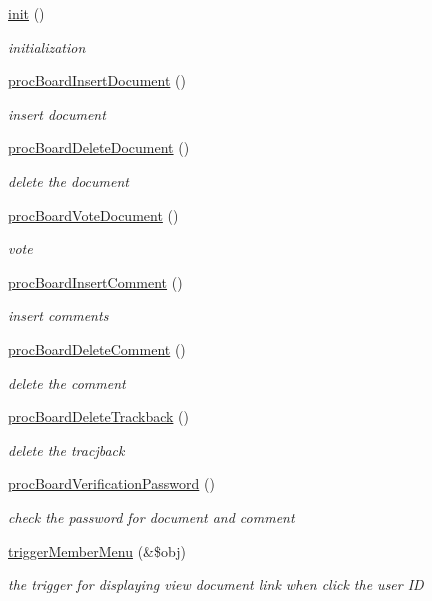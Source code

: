\begin{DoxyCompactItemize}
\item 
\hyperlink{classboardController_a1e9dcbf2879520adc6c5ce9b68361408}{init} ()
\begin{DoxyCompactList}\small\item\em initialization \end{DoxyCompactList}\item 
\hyperlink{classboardController_a14ee978c5be08ee33f4c00a6960c4e60}{proc\+Board\+Insert\+Document} ()
\begin{DoxyCompactList}\small\item\em insert document \end{DoxyCompactList}\item 
\hyperlink{classboardController_a3e67502fb41d52a0425f40906029576b}{proc\+Board\+Delete\+Document} ()
\begin{DoxyCompactList}\small\item\em delete the document \end{DoxyCompactList}\item 
\hyperlink{classboardController_a8ff91d133ca5ca109b91f218ff306738}{proc\+Board\+Vote\+Document} ()
\begin{DoxyCompactList}\small\item\em vote \end{DoxyCompactList}\item 
\hyperlink{classboardController_ab643a9d4d386833e92bc2d7114319fb2}{proc\+Board\+Insert\+Comment} ()
\begin{DoxyCompactList}\small\item\em insert comments \end{DoxyCompactList}\item 
\hyperlink{classboardController_af5cfe27b152d9806acf0ced54299b0ea}{proc\+Board\+Delete\+Comment} ()
\begin{DoxyCompactList}\small\item\em delete the comment \end{DoxyCompactList}\item 
\hyperlink{classboardController_a8a71a5c163777a169a3e843c2f6dafae}{proc\+Board\+Delete\+Trackback} ()
\begin{DoxyCompactList}\small\item\em delete the tracjback \end{DoxyCompactList}\item 
\hyperlink{classboardController_a0e52095fdfe92ab0533ac33e329e31c6}{proc\+Board\+Verification\+Password} ()
\begin{DoxyCompactList}\small\item\em check the password for document and comment \end{DoxyCompactList}\item 
\hyperlink{classboardController_a1f462e1fe4adab5463f527be6f0dd2b9}{trigger\+Member\+Menu} (\&\$obj)
\begin{DoxyCompactList}\small\item\em the trigger for displaying \textquotesingle{}view document\textquotesingle{} link when click the user I\+D \end{DoxyCompactList}\end{DoxyCompactItemize}
